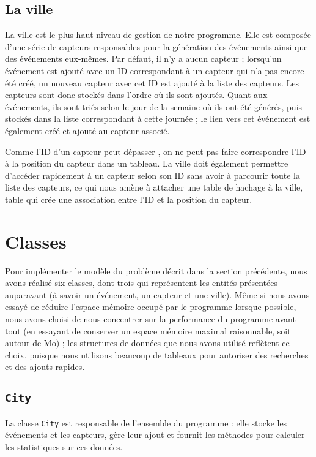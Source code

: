 \documentclass[11pt,a4paper]{article}
\begin{document}
\subsection{La ville}

La ville est le plus haut niveau de gestion de notre programme. Elle est composée d'une série de capteurs responsables pour la génération des événements ainsi que des événements eux-mêmes. Par défaut, il n'y a aucun capteur ; lorsqu'un événement est ajouté avec un ID correspondant à un capteur qui n'a pas encore été créé, un nouveau capteur avec cet ID est ajouté à la liste des capteurs. Les capteurs sont donc stockés dans l'ordre où ils sont ajoutés. Quant aux événements, ils sont triés selon le jour de la semaine où ils ont été générés, puis stockés dans la liste correspondant à cette journée ; le lien vers cet événement est également créé et ajouté au capteur associé.

Comme l'ID d'un capteur peut dépasser , on ne peut pas faire correspondre l'ID à la position du capteur dans un tableau. La ville doit également permettre d'accéder rapidement à un capteur selon son ID sans avoir à parcourir toute la liste des capteurs, ce qui nous amène à attacher une table de hachage à la ville, table qui crée une association entre l'ID et la position du capteur.

\section{Classes}

Pour implémenter le modèle du problème décrit dans la section précédente, nous avons réalisé six classes, dont trois qui représentent les entités présentées auparavant (à savoir un événement, un capteur et une ville). Même si nous avons essayé de réduire l'espace mémoire occupé par le programme lorsque possible, nous avons choisi de nous concentrer sur la performance du programme avant tout (en essayant de conserver un espace mémoire maximal raisonnable, soit autour de  Mo) ; les structures de données que nous avons utilisé reflètent ce choix, puisque nous utilisons beaucoup de tableaux pour autoriser des recherches et des ajouts rapides.

\subsection{\texttt{City}}
\label{subsec:City}

La classe \texttt{City} est responsable de l'ensemble du programme : elle stocke les événements et les capteurs, gère leur ajout et fournit les méthodes pour calculer les statistiques sur ces données.
\end{document}
